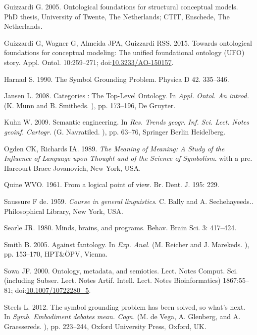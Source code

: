 \documentclass[a4paper,11pt,oneside,oldfontcommands]{memoir}
\theoremstyle{definition}
\theoremstyle{break}		%
\numberwithin{equation}{chapter}
\numberwithin{figure}{chapter}
\begin{document}
\leavevmode\hypertarget{ref-Guizzardi:2005vt}{}%
Guizzardi G. 2005. Ontological foundations for structural conceptual
models. PhD thesis, University of Twente, The Netherlands; CTIT,
Enschede, The Netherlands.

\leavevmode\hypertarget{ref-Guizzardi:2015ky}{}%
Guizzardi G, Wagner G, Almeida JPA, Guizzardi RSS. 2015. Towards
ontological foundations for conceptual modeling: The unified
foundational ontology (UFO) story. Appl. Ontol. 10:259--271;
doi:\href{https://doi.org/10.3233/AO-150157}{10.3233/AO-150157}.

\leavevmode\hypertarget{ref-Harnad1990}{}%
Harnad S. 1990. The Symbol Grounding Problem. Physica D 42. 335--346.

\leavevmode\hypertarget{ref-Jansen2008}{}%
Jansen L. 2008. Categories : The Top-Level Ontology. In \emph{Appl.
Ontol. An introd.} (K. Munn and B. Smitheds. ), pp. 173--196, De
Gruyter.

\leavevmode\hypertarget{ref-Kuhn2009}{}%
Kuhn W. 2009. Semantic engineering. In \emph{Res. Trends geogr. Inf.
Sci. Lect. Notes geoinf. Cartogr.} (G. Navratiled. ), pp. 63--76,
Springer Berlin Heidelberg.

\leavevmode\hypertarget{ref-Ogden1989}{}%
Ogden CK, Richards IA. 1989. \emph{The Meaning of Meaning: A Study of
the Influence of Language upon Thought and of the Science of Symbolism}.
with a pre. Harcourt Brace Jovanovich, New York, USA.

\leavevmode\hypertarget{ref-Quine:1953er}{}%
Quine WVO. 1961. From a logical point of view. Br. Dent. J. 195: 229.

\leavevmode\hypertarget{ref-Saussure:1983ka}{}%
Saussure F de. 1959. \emph{Course in general linguistics}. C. Bally and
A. Sechehayeeds.. Philosophical Library, New York, USA.

\leavevmode\hypertarget{ref-Searle:1980hw}{}%
Searle JR. 1980. Minds, brains, and programs. Behav. Brain Sci. 3:
417--424.

\leavevmode\hypertarget{ref-Smith2005}{}%
Smith B. 2005. Against fantology. In \emph{Exp. Anal.} (M. Reicher and
J. Marekeds. ), pp. 153--170, HPT\&ÖPV, Vienna.

\leavevmode\hypertarget{ref-Sowa:2000di}{}%
Sowa JF. 2000. Ontology, metadata, and semiotics. Lect. Notes Comput.
Sci. (including Subser. Lect. Notes Artif. Intell. Lect. Notes
Bioinformatics) 1867:55--81;
doi:\href{https://doi.org/10.1007/10722280_5}{10.1007/10722280\_5}.

\leavevmode\hypertarget{ref-Steels:2008tr}{}%
Steels L. 2012. The symbol grounding problem has been solved, so what's
next. In \emph{Symb. Embodiment debates mean. Cogn.} (M. de Vega, A.
Glenberg, and A. Graessereds. ), pp. 223--244, Oxford University Press,
Oxford, UK.
\end{document}
